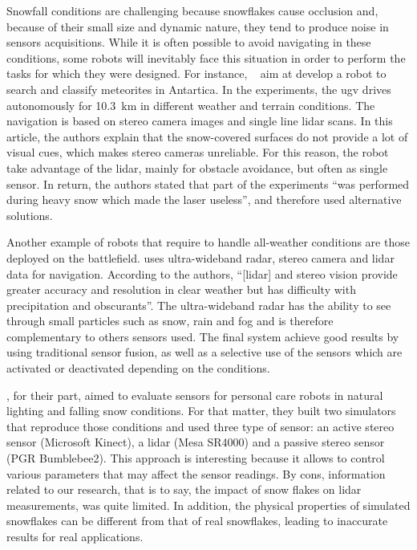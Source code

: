 Snowfall conditions are challenging because snowflakes cause occlusion and, because of their small size and dynamic nature, they tend to produce noise in sensors acquisitions. While it is often possible to avoid navigating in these conditions, some robots will inevitably face this situation in order to perform the tasks for which they were designed. For instance, ~\citet{Moorehead_1999_2122} aim at develop a robot to search and classify meteorites in Antartica. In the experiments, the \gls*{ugv} drives autonomously for \SI{10.3}{\kilo\meter} in different weather and terrain conditions. The navigation is based on stereo camera images and single line \gls*{lidar} scans. In this article, the authors explain that the snow-covered surfaces do not provide a lot of visual cues, which makes stereo cameras unreliable. For this reason, the robot take advantage of the \gls*{lidar}, mainly for obstacle avoidance, but often as single sensor. In return, the authors stated that part of the experiments \enquote{was performed during heavy snow which made the laser useless}, and therefore used alternative solutions. 

Another example of robots that require to handle all-weather conditions are those deployed on the battlefield. \citet{yamauchi2010fusing} uses ultra-wideband radar, stereo camera and \gls*{lidar} data for navigation. According to the authors, \enquote{[\gls*{lidar}] and stereo vision provide greater accuracy and resolution in clear weather but has difficulty with precipitation and obscurants}. The ultra-wideband radar has the ability to see through small particles such as snow, rain and fog and is therefore complementary to others sensors used. The final system achieve good results by using traditional sensor fusion, as well as a selective use of the sensors which are activated or deactivated depending on the conditions. 

\citet{sumi-arso-13}, for their part, aimed to evaluate sensors for personal care robots in natural lighting and falling snow conditions. For that matter, they built two simulators that reproduce those conditions and used three type of sensor: an active stereo sensor (Microsoft Kinect), a \gls*{lidar} (Mesa SR4000) and a passive stereo sensor (PGR Bumblebee2). This approach is interesting because it allows to control various parameters that may affect the sensor readings. By cons, information related to our research, that is to say, the impact of snow flakes on \gls*{lidar} measurements, was quite limited. In addition, the physical properties of simulated snowflakes can be different from that of real snowflakes, leading to inaccurate results for real applications.

